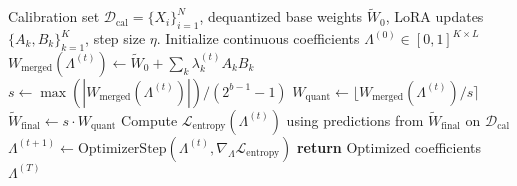 \begin{algorithm}[t]
  \caption{Quantization-Aware Adapter Coefficient Search (QA-ACS)}
  \label{alg:qa-acs}
  \begin{algorithmic}[1]
    \REQUIRE Calibration set $\mathcal{D}_{\text{cal}} = \{X_i\}_{i=1}^N$, dequantized base weights $\tilde{W}_0$, LoRA updates $\{A_k, B_k\}_{k=1}^K$, step size $\eta$.
    \STATE Initialize continuous coefficients $\Lambda^{(0)} \in [0, 1]^{K \times L}$
      \STATE $W_{\text{merged}}(\Lambda^{(t)}) \leftarrow \tilde{W}_0 + \sum_{k} \lambda_k^{(t)} A_k B_k$
      \STATE $s \leftarrow \max(|W_{\text{merged}}(\Lambda^{(t)})|) / (2^{b-1} - 1)$
      \STATE $W_{\text{quant}} \leftarrow \lfloor W_{\text{merged}}(\Lambda^{(t)}) / s \rceil$ 
      \STATE $\tilde{W}_{\text{final}} \leftarrow s \cdot W_{\text{quant}}$
      \STATE Compute $\mathcal{L}_{\text{entropy}}(\Lambda^{(t)})$ using predictions from $\tilde{W}_{\text{final}}$ on $\mathcal{D}_{\text{cal}}$
      \STATE $\Lambda^{(t+1)} \leftarrow \text{OptimizerStep}(\Lambda^{(t)}, \nabla_{\Lambda} \mathcal{L}_{\text{entropy}})$
    \ENDFOR
    \STATE \textbf{return} Optimized coefficients $\Lambda^{(T)}$
  \end{algorithmic}
\end{algorithm}